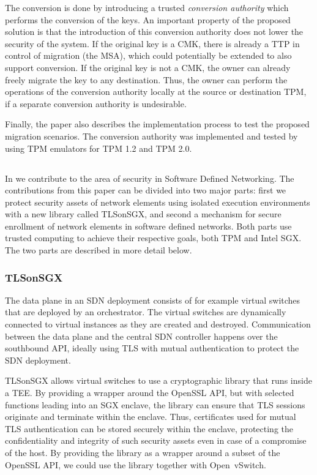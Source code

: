 The conversion is done by introducing a trusted \emph{conversion authority} which performs the conversion of the keys.
An important property of the proposed solution is that the introduction of this conversion authority does not lower the security of the system.
If the original key is a CMK, there is already a TTP in control of migration (the MSA), which could potentially be extended to also support conversion.
If the original key is not a CMK, the owner can already freely migrate the key to any destination.
Thus, the owner can perform the operations of the conversion authority locally at the source or destination TPM, if a separate conversion authority is undesirable.

Finally, the paper also describes the implementation process to test the proposed migration scenarios.
The conversion authority was implemented and tested by using TPM emulators for TPM 1.2 and TPM 2.0.

\subsection{\paperIIItitle}

In  we contribute to the area of security in Software Defined Networking.
The contributions from this paper can be divided into two major parts: first we protect security assets of network elements using isolated execution environments with a new library called TLSonSGX, and second a mechanism for secure enrollment of network elements in software defined networks.
Both parts use trusted computing to achieve their respective goals, both TPM and Intel SGX.
The two parts are described in more detail below.

\subsubsection{TLSonSGX}

The data plane in an SDN deployment consists of for example virtual switches that are deployed by an orchestrator.
The virtual switches are dynamically connected to virtual instances as they are created and destroyed.
Communication between the data plane and the central SDN controller happens over the southbound API, ideally using TLS with mutual authentication to protect the SDN deployment.

TLSonSGX allows virtual switches to use a cryptographic library that runs inside a TEE.
By providing a wrapper around the OpenSSL API, but with selected functions leading into an SGX enclave, the library can ensure that TLS sessions originate and terminate within the enclave.
Thus, certificates used for mutual TLS authentication can be stored securely within the enclave, protecting the confidentiality and integrity of such security assets even in case of a compromise of the host.
By providing the library as a wrapper around a subset of the OpenSSL API, we could use the library together with Open~vSwitch.

